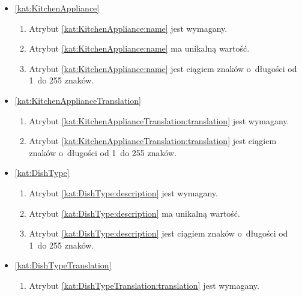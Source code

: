 \begin{itemize}[label={\textbf{Ograniczenia dla}}, wide, labelwidth=!, labelindent=0pt]
    \item\ref{kat:KitchenAppliance}\mynobreakpar
    \begin{enumerate}[label={\textbf{OGR/3/\protect\twodigits{\arabic{enumi}}}}, wide, labelwidth=!, align=left, leftmargin=3cm, resume]
        \item Atrybut \ref{kat:KitchenAppliance:name} jest wymagany.

        \item Atrybut \ref{kat:KitchenAppliance:name} ma unikalną wartość.

        \item Atrybut \ref{kat:KitchenAppliance:name} jest ciągiem znaków o~długości od 1~do 255 znaków.
    \end{enumerate}

    \item\ref{kat:KitchenApplianceTranslation}\mynobreakpar
    \begin{enumerate}[label={\textbf{OGR/3/\protect\twodigits{\arabic{enumi}}}}, wide, labelwidth=!, align=left, leftmargin=3cm, resume]
        \item Atrybut \ref{kat:KitchenApplianceTranslation:translation} jest wymagany.

        \item Atrybut \ref{kat:KitchenApplianceTranslation:translation} jest ciągiem znaków o~długości od 1~do 255 znaków.
    \end{enumerate}

    \item\ref{kat:DishType}\mynobreakpar
    \begin{enumerate}[label={\textbf{OGR/3/\protect\twodigits{\arabic{enumi}}}}, wide, labelwidth=!, align=left, leftmargin=3cm, resume]
        \item Atrybut \ref{kat:DishType:description} jest wymagany.

        \item Atrybut \ref{kat:DishType:description} ma unikalną wartość.

        \item Atrybut \ref{kat:DishType:description} jest ciągiem znaków o~długości od 1~do 255 znaków.
    \end{enumerate}

    \item\ref{kat:DishTypeTranslation}\mynobreakpar
    \begin{enumerate}[label={\textbf{OGR/3/\protect\twodigits{\arabic{enumi}}}}, wide, labelwidth=!, align=left, leftmargin=3cm, resume]
        \item Atrybut \ref{kat:DishTypeTranslation:translation} jest wymagany.


\end{enumerate}
\end{itemize}
